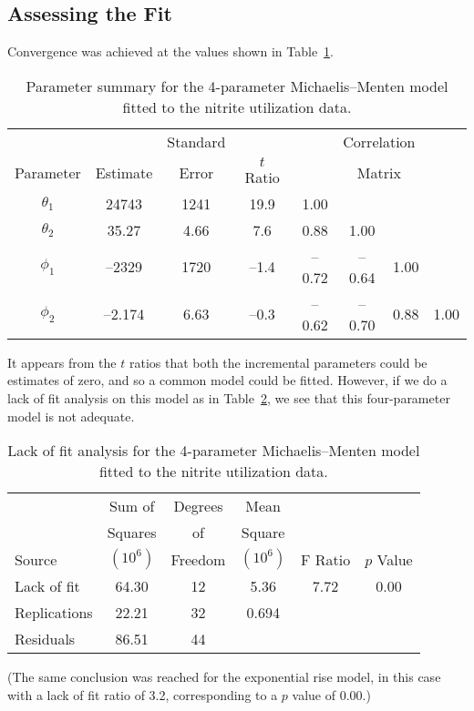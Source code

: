 \subsection{Assessing the Fit}

Convergence was achieved at the values shown in
Table~\ref{tbl:3.4}.
\begin{table}
  \caption{
  Parameter summary for the 4-parameter Michaelis--Menten model
  fitted to the nitrite utilization data.
  }\label{tbl:3.4}
  \begin{center}
    \begin{tabular}{cccccccc}\hline
      &&\multicolumn{1}{c}{Standard}&&\multicolumn{4}{c}{Correlation}\\
      \multicolumn{1}{c}{Parameter}&\multicolumn{1}{c}{Estimate}&
      \multicolumn{1}{c}{Error}&\multicolumn{1}{c}{$t$ Ratio} &
      \multicolumn{4}{c}{Matrix}\\ \hline
      $\theta_{1}$&24743&1241&19.9&1.00\\
      $\theta_{2}$&35.27&4.66&7.6&0.88&1.00\\
      $\phi_{1}$&--2329&1720&--1.4&--\/0.72&--\/0.64&1.00\\
      $\phi_{2}$&--2.174&6.63&--\/0.3&--\/0.62&--\/0.70&0.88&1.00\\ \hline
    \end{tabular}
  \end{center}
\end{table}
It appears from the $t$ ratios that both the
incremental parameters could be estimates of zero, and so a
common model could be fitted.
However, if we do a lack of fit analysis on this model as in
Table~\ref{tbl:mic4lof},
we see that this four-parameter model is not adequate.
\begin{table}
  \caption{
  Lack of fit analysis for the 4-parameter Michaelis--Menten model
  fitted to the nitrite utilization data.}\label{tbl:mic4lof}
  \begin{center}
    \begin{tabular}{lccccc}\hline
      &\multicolumn{1}{c}{Sum of} &\multicolumn{1}{c}{Degrees}
      &\multicolumn{1}{c}{Mean}\\ & 
      \multicolumn{1}{c}{Squares}& \multicolumn{1}{c}{of}
      &\multicolumn{1}{c}{Square}\\ 
      Source&\multicolumn{1}{c}{$(10^6 )$}&\multicolumn{1}{c}{Freedom}
      &\multicolumn{1}{c}{$(10^6 )$} &\multicolumn{1}{c}{F Ratio}&
      \multicolumn{1}{c}{$p$ Value}\\ \hline
      Lack of fit&64.30&12&5.36&7.72&0.00\\
      Replications&22.21&32&0.694\\ \hline
      Residuals&86.51&44\\ \hline
    \end{tabular}
  \end{center}
\end{table}
(The same conclusion was reached for the exponential rise model,
in this case with a lack of fit ratio of 3.2,
corresponding to a $p$ value of 0.00.)

